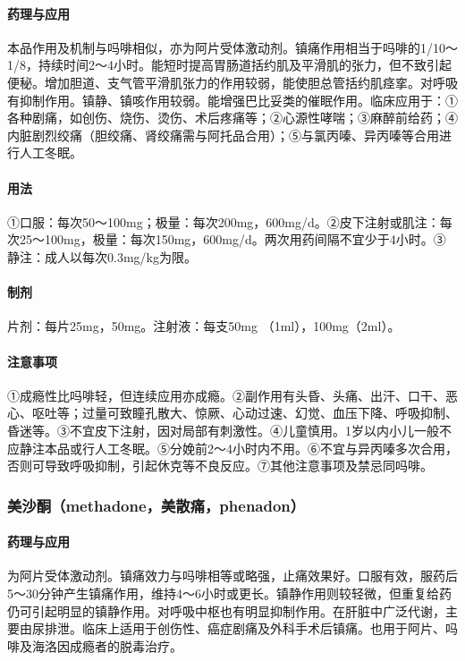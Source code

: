 \paragraph{药理与应用}

本品作用及机制与吗啡相似，亦为阿片受体激动剂。镇痛作用相当于吗啡的1/10～1/8，持续时间2～4小时。能短时提高胃肠道括约肌及平滑肌的张力，但不致引起便秘。增加胆道、支气管平滑肌张力的作用较弱，能使胆总管括约肌痉挛。对呼吸有抑制作用。镇静、镇咳作用较弱。能增强巴比妥类的催眠作用。临床应用于：①各种剧痛，如创伤、烧伤、烫伤、术后疼痛等；②心源性哮喘；③麻醉前给药；④内脏剧烈绞痛（胆绞痛、肾绞痛需与阿托品合用）；⑤与氯丙嗪、异丙嗪等合用进行人工冬眠。

\paragraph{用法}

①口服：每次50～100mg；极量：每次200mg，600mg/d。②皮下注射或肌注：每次25～100mg，极量：每次150mg，600mg/d。两次用药间隔不宜少于4小时。③静注：成人以每次0.3mg/kg为限。

\paragraph{制剂}

片剂：每片25mg，50mg。注射液：每支50mg （1ml），100mg（2ml）。

\paragraph{注意事项}

①成瘾性比吗啡轻，但连续应用亦成瘾。②副作用有头昏、头痛、出汗、口干、恶心、呕吐等；过量可致瞳孔散大、惊厥、心动过速、幻觉、血压下降、呼吸抑制、昏迷等。③不宜皮下注射，因对局部有刺激性。④儿童慎用。1岁以内小儿一般不应静注本品或行人工冬眠。⑤分娩前2～4小时内不用。⑥不宜与异丙嗪多次合用，否则可导致呼吸抑制，引起休克等不良反应。⑦其他注意事项及禁忌同吗啡。

\subsubsection{美沙酮（methadone，美散痛，phenadon）}

\paragraph{药理与应用}

为阿片受体激动剂。镇痛效力与吗啡相等或略强，止痛效果好。口服有效，服药后5～30分钟产生镇痛作用，维持4～6小时或更长。镇静作用则较轻微，但重复给药仍可引起明显的镇静作用。对呼吸中枢也有明显抑制作用。在肝脏中广泛代谢，主要由尿排泄。临床上适用于创伤性、癌症剧痛及外科手术后镇痛。也用于阿片、吗啡及海洛因成瘾者的脱毒治疗。

